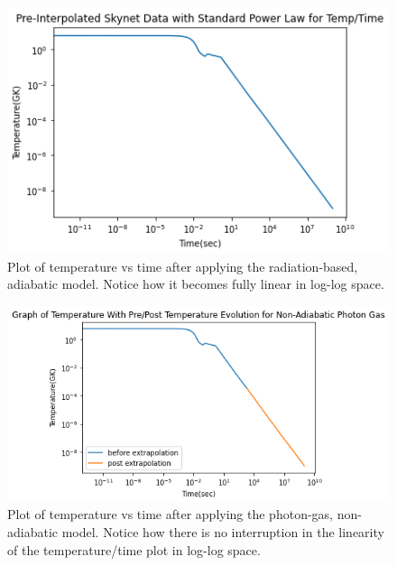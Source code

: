 \documentclass[11pt,a4paper]{article}
\begin{document}
\begin{figure}[h!]
  \includegraphics[scale = .7]{linear_temp.png}
  \centering
  \caption{Plot of temperature vs time after applying the radiation-based, adiabatic model. Notice how it becomes fully linear in log-log space.}
\end{figure} 

\begin{figure}[h!]
  \includegraphics[scale = .7]{photon_only.png}
  \centering
  \caption{Plot of temperature vs time after applying the photon-gas, non-adiabatic model. Notice how there is no interruption in the linearity of the temperature/time plot in log-log space.}
\end{figure} 
\end{document}
